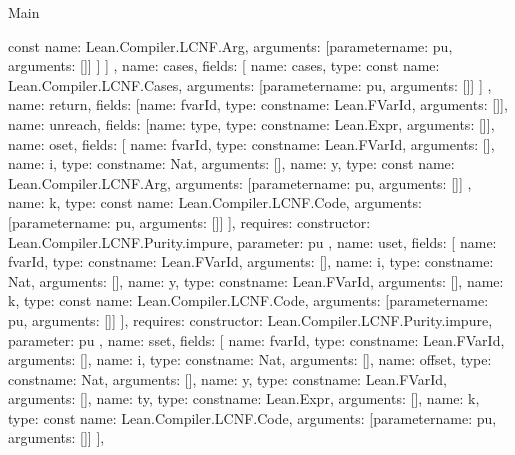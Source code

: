 \begin{lexlean}{Main}
\begin{toolingmodule}
{{{{{                  const{
                    name: Lean.Compiler.LCNF.Arg,
                    arguments: [parameter{name: pu, arguments: []}]
                  }
                ]
              }
            }
          ]
        },
        {
          name: cases,
          fields: [
            {
              name: cases,
              type: const{
                name: Lean.Compiler.LCNF.Cases,
                arguments: [parameter{name: pu, arguments: []}]
              }
            }
          ]
        },
        {name: return, fields: [{name: fvarId, type: const{name: Lean.FVarId, arguments: []}}]},
        {name: unreach, fields: [{name: type, type: const{name: Lean.Expr, arguments: []}}]},
        {
          name: oset,
          fields: [
            {name: fvarId, type: const{name: Lean.FVarId, arguments: []}},
            {name: i, type: const{name: Nat, arguments: []}},
            {
              name: y,
              type: const{
                name: Lean.Compiler.LCNF.Arg,
                arguments: [parameter{name: pu, arguments: []}]
              }
            },
            {
              name: k,
              type: const{
                name: Lean.Compiler.LCNF.Code,
                arguments: [parameter{name: pu, arguments: []}]
              }
            }
          ],
          requires: {constructor: Lean.Compiler.LCNF.Purity.impure, parameter: pu}
        },
        {
          name: uset,
          fields: [
            {name: fvarId, type: const{name: Lean.FVarId, arguments: []}},
            {name: i, type: const{name: Nat, arguments: []}},
            {name: y, type: const{name: Lean.FVarId, arguments: []}},
            {
              name: k,
              type: const{
                name: Lean.Compiler.LCNF.Code,
                arguments: [parameter{name: pu, arguments: []}]
              }
            }
          ],
          requires: {constructor: Lean.Compiler.LCNF.Purity.impure, parameter: pu}
        },
        {
          name: sset,
          fields: [
            {name: fvarId, type: const{name: Lean.FVarId, arguments: []}},
            {name: i, type: const{name: Nat, arguments: []}},
            {name: offset, type: const{name: Nat, arguments: []}},
            {name: y, type: const{name: Lean.FVarId, arguments: []}},
            {name: ty, type: const{name: Lean.Expr, arguments: []}},
            {
              name: k,
              type: const{
                name: Lean.Compiler.LCNF.Code,
                arguments: [parameter{name: pu, arguments: []}]
              }
            }
          ],
}}}
\end{toolingmodule}
\end{lexlean}
